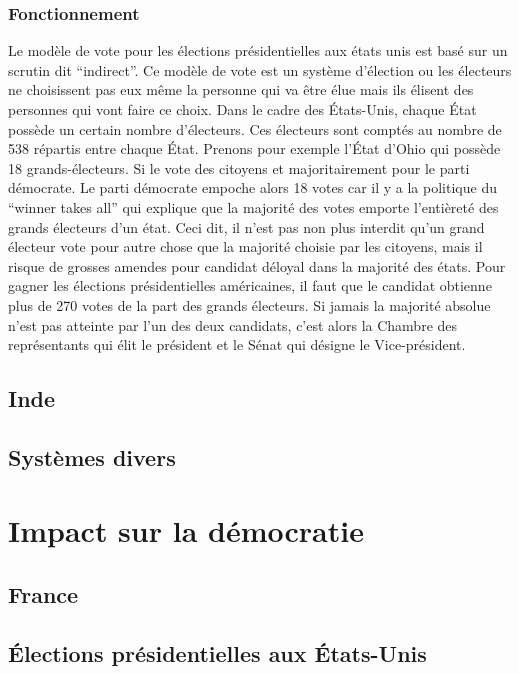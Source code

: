 \documentclass[12pt,a4paper]{report}
\begin{document}
\subsection{Fonctionnement} %
Le modèle de vote pour les élections présidentielles aux états unis est basé sur un scrutin dit “indirect”.
Ce modèle de vote est un système d'élection ou les électeurs ne choisissent pas eux même la personne qui va être élue mais ils élisent des personnes qui vont faire ce choix.
Dans le cadre des États-Unis, chaque État possède un certain nombre d'électeurs.
Ces électeurs sont comptés au nombre de 538 répartis entre chaque État.
Prenons pour exemple l'État d'Ohio qui possède 18 grands-électeurs.
Si le vote des citoyens et majoritairement pour le parti démocrate.
Le parti démocrate empoche alors 18 votes car il y a la politique du “winner takes all” qui explique que la majorité des votes emporte l'entièreté des grands électeurs d’un état.
Ceci dit, il n’est pas non plus interdit qu’un grand électeur vote pour autre chose que la majorité choisie par les citoyens, mais il risque de grosses amendes pour candidat déloyal dans la majorité des états.
Pour gagner les élections présidentielles américaines, il faut que le candidat obtienne plus de 270 votes de la part des grands électeurs.
Si jamais la majorité absolue n’est pas atteinte par l’un des deux candidats, c’est alors la Chambre des représentants qui élit le président et le Sénat qui désigne le Vice-président.
\nocite{wiki:electday}
\nocite{wiki:elecus}
\nocite{wiki:eleccoll}

\section{Inde} %

\section{Systèmes divers} %


\chapter{Impact sur la démocratie}

\section{France} %

\section{Élections présidentielles aux États-Unis}
\end{document}
